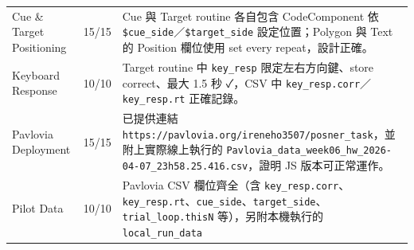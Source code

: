 \documentclass[14pt,]{extarticle}
\begin{document}
\begin{longtable}[]{@{}lll@{}}
\begin{minipage}[t]{0.09\columnwidth}\raggedright
Cue \& Target Positioning\strut
\end{minipage} & \begin{minipage}[t]{0.09\columnwidth}\raggedright
15/15\strut
\end{minipage} & \begin{minipage}[t]{0.09\columnwidth}\raggedright
Cue 與 Target routine 各自包含 CodeComponent 依
\texttt{\$cue\_side}／\texttt{\$target\_side} 設定位置；Polygon 與 Text
的 Position 欄位使用 set every repeat，設計正確。\strut
\end{minipage}\tabularnewline
\begin{minipage}[t]{0.09\columnwidth}\raggedright
Keyboard Response\strut
\end{minipage} & \begin{minipage}[t]{0.09\columnwidth}\raggedright
10/10\strut
\end{minipage} & \begin{minipage}[t]{0.09\columnwidth}\raggedright
Target routine 中 \texttt{key\_resp} 限定左右方向鍵、store correct、最大
1.5 秒 ✓，CSV 中 \texttt{key\_resp.corr}／\texttt{key\_resp.rt}
正確記錄。\strut
\end{minipage}\tabularnewline
\begin{minipage}[t]{0.09\columnwidth}\raggedright
Pavlovia Deployment\strut
\end{minipage} & \begin{minipage}[t]{0.09\columnwidth}\raggedright
15/15\strut
\end{minipage} & \begin{minipage}[t]{0.09\columnwidth}\raggedright
已提供連結
\texttt{https://pavlovia.org/ireneho3507/posner\_task}，並附上實際線上執行的
\texttt{Pavlovia\_data\_week06\_hw\_2026-04-07\_23h58.25.416.csv}，證明
JS 版本可正常運作。\strut
\end{minipage}\tabularnewline
\begin{minipage}[t]{0.09\columnwidth}\raggedright
Pilot Data\strut
\end{minipage} & \begin{minipage}[t]{0.09\columnwidth}\raggedright
10/10\strut
\end{minipage} & \begin{minipage}[t]{0.09\columnwidth}\raggedright
Pavlovia CSV 欄位齊全（含
\texttt{key\_resp.corr}、\texttt{key\_resp.rt}、\texttt{cue\_side}、\texttt{target\_side}、\texttt{trial\_loop.thisN}
等），另附本機執行的 \texttt{local\_run\_data}

\end{minipage}
\end{longtable}
\end{document}

